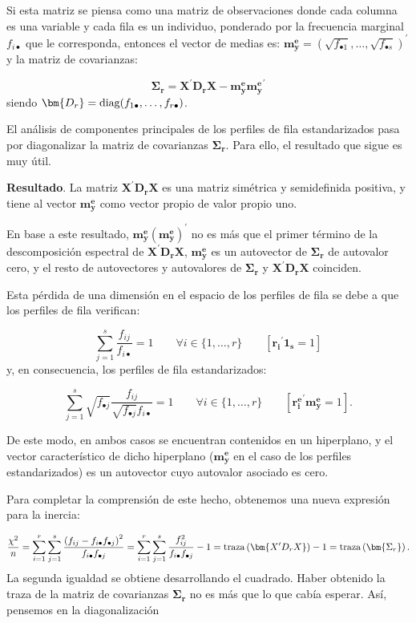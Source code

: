 \documentclass[
  a4paper,
  oneside]{scrbook}
\theoremstyle{definition}
\theoremstyle{definition}
\theoremstyle{definition}
\theoremstyle{definition}
\theoremstyle{remark}
\begin{document}
Si esta matriz se piensa como una matriz de observaciones donde cada
columna es una variable y cada fila es un individuo, ponderado por la
frecuencia marginal \(f_{i\bullet}\) que le corresponda, entonces el
vector de medias es:
\(\bm{m_y^e}=\left(\sqrt{f_{\bullet 1}},\ldots,\sqrt{f_{\bullet s}}\right)^\prime{}\)
y la matriz de covarianzas:

\[\bm{\Sigma_r}=\bm{X}^{\prime} \bm{D_r} \bm{X} - \bm{m_y^e}{\bm{m_y^e}}^\prime{}\]
siendo \(\bm{D_r}=\textnormal{diag}(f_{1\bullet},\ldots,f_{r\bullet})\).

El análisis de componentes principales de los perfiles de fila
estandarizados pasa por diagonalizar la matriz de covarianzas
\(\bm{\Sigma_r}\). Para ello, el resultado que sigue es muy útil.

\textbf{Resultado}. La matriz \(\bm{X^{\prime} D_r X}\) es una matriz simétrica
y semidefinida positiva, y tiene al vector \(\bm{m_y^e}\) como vector
propio de valor propio uno.

En base a este resultado, \(\bm{m_y^e}(\bm{m_y^e})^{\prime}\) no es más
que el primer término de la descomposición espectral de
\(\bm{X^{\prime} D_r X}\), \(\bm{m_y^e}\) es un autovector de
\(\bm{\Sigma_r}\) de autovalor cero, y el resto de autovectores y
autovalores de \(\bm{\Sigma_r}\) y \(\bm{X^{\prime} D_r X}\) coinciden.

Esta pérdida de una dimensión en el espacio de los perfiles de fila se
debe a que los perfiles de fila verifican:

\[\sum_{j=1}^s \frac{f_{i j}}{f_{i\bullet}}=1 \qquad \forall i\in\{1,\ldots,r\}
\qquad \left[\bm{r_i}^\prime{}\bm{1_s}=1\right]\] y, en consecuencia,
los perfiles de fila estandarizados:

\[\sum_{j=1}^s \sqrt{f_{\bullet j}}
\frac{f_{i j}}{\sqrt{f_{\bullet j}}f_{i\bullet}}=1 \qquad \forall i\in\{1,\ldots,r\}
\qquad \left[{\bm{r_i^e}}^\prime{}\bm{m_y^e}=1\right].\]

De este modo, en
ambos casos se encuentran contenidos en un hiperplano, y el vector
característico de dicho hiperplano (\(\bm{m_y^e}\) en el caso de los
perfiles estandarizados) es un autovector cuyo autovalor asociado es
cero.

Para completar la comprensión de este hecho, obtenemos una nueva
expresión para la inercia:

\[\frac{\chi^2}{n}
=\sum_{i=1}^r\sum_{j=1}^s
\frac{\left(f_{ij}-f_{i\bullet}f_{\bullet j}\right)^2}{f_{i\bullet}f_{\bullet j}}
=\sum_{i=1}^r\sum_{j=1}^s
\frac{f_{ij}^2}{f_{i\bullet}f_{\bullet j}}-1=\textnormal{traza} \left(\bm{X^{\prime} D_r X}\right)-1
=\textnormal{traza} \left(\bm{\Sigma_r}\right).\] La segunda igualdad se
obtiene desarrollando el cuadrado. Haber obtenido la traza de la matriz
de covarianzas \(\bm{\Sigma_r}\) no es más que lo que cabía esperar. Así, pensemos en la diagonalización
\end{document}
